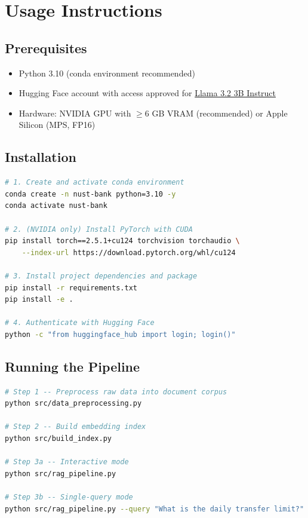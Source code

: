 \documentclass[12pt,a4paper]{article}
\begin{document}
\section{Usage Instructions}

\subsection{Prerequisites}

\begin{itemize}
  \item Python 3.10 (conda environment recommended)
  \item Hugging Face account with access approved for
        \href{https://huggingface.co/meta-llama/Llama-3.2-3B-Instruct}{Llama 3.2 3B Instruct}
  \item Hardware: NVIDIA GPU with $\geq$6 GB VRAM (recommended) or Apple Silicon
        (MPS, FP16)
\end{itemize}

\subsection{Installation}

\begin{lstlisting}[language=bash, caption={Environment setup}]
# 1. Create and activate conda environment
conda create -n nust-bank python=3.10 -y
conda activate nust-bank

# 2. (NVIDIA only) Install PyTorch with CUDA
pip install torch==2.5.1+cu124 torchvision torchaudio \
    --index-url https://download.pytorch.org/whl/cu124

# 3. Install project dependencies and package
pip install -r requirements.txt
pip install -e .

# 4. Authenticate with Hugging Face
python -c "from huggingface_hub import login; login()"
\end{lstlisting}

\subsection{Running the Pipeline}

\begin{lstlisting}[language=bash, caption={Three-step pipeline execution}]
# Step 1 -- Preprocess raw data into document corpus
python src/data_preprocessing.py

# Step 2 -- Build embedding index
python src/build_index.py

# Step 3a -- Interactive mode
python src/rag_pipeline.py

# Step 3b -- Single-query mode
python src/rag_pipeline.py --query "What is the daily transfer limit?"
\end{lstlisting}
\end{document}
